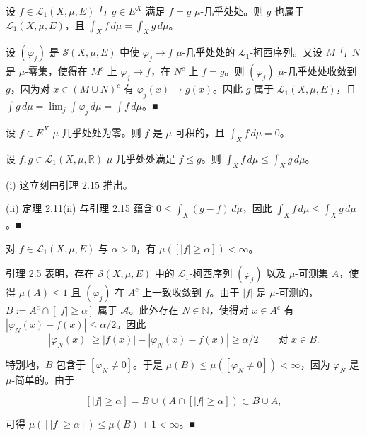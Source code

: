 \begin{lemma}

设 $ f \in \mathcal{L}_1(X,\mu,E) $ 与 $ g \in E^X $ 满足 $ f = g $ $ \mu $-几乎处处。则 $ g $ 也属于 $ \mathcal{L}_1(X,\mu,E) $，且 $ \int_X f \, d\mu = \int_X g \, d\mu $。

\proofhead
设 $ (\varphi_j) $ 是 $ \mathcal{S}(X,\mu,E) $ 中使 $ \varphi_j \to f $ $ \mu $-几乎处处的 $ \mathcal{L}_1 $-柯西序列。又设 $ M $ 与 $ N $ 是 $ \mu $-零集，使得在 $ M^c $ 上 $ \varphi_j \to f $，在 $ N^c $ 上 $ f = g $。则 $ (\varphi_j) $ $ \mu $-几乎处处收敛到 $ g $，因为对 $ x \in (M \cup N)^c $ 有 $ \varphi_j(x) \to g(x) $。因此 $ g $ 属于 $ \mathcal{L}_1(X,\mu,E) $，且 $ \int g \, d\mu = \lim_{j} \int \varphi_j \, d\mu = \int f \, d\mu $。\nobreak\hspace{0.35em}■
\end{lemma}

\begin{corollary}

\begin{subitems}
\item

设 $ f \in E^X $ $ \mu $-几乎处处为零。则 $ f $ 是 $ \mu $-可积的，且 $ \int_X f \, d\mu = 0 $。

\item

设 $ f, g \in \mathcal{L}_1(X,\mu,\mathbb{R}) $ $ \mu $-几乎处处满足 $ f \le g $。则 $ \int_X f \, d\mu \le \int_X g \, d\mu $。

\proofhead
(i) 这立刻由引理 2.15 推出。
\end{subitems}

(ii) 定理 2.11(ii) 与引理 2.15 蕴含 $ 0 \le \int_X (g - f) \, d\mu $，因此 $ \int_X f \, d\mu \le \int_X g \, d\mu $。\nobreak\hspace{0.35em}■

\end{corollary}

\begin{proposition}

对 $ f \in \mathcal{L}_1(X,\mu,E) $ 与 $ \alpha > 0 $，有 $ \mu([|f| \ge \alpha]) < \infty $。

\proofhead
引理 2.5 表明，存在 $ \mathcal{S}(X,\mu,E) $ 中的 $ \mathcal{L}_1 $-柯西序列 $ (\varphi_j) $ 以及 $ \mu $-可测集 $ A $，使得 $ \mu(A) \le 1 $ 且 $ (\varphi_j) $ 在 $ A^c $ 上一致收敛到 $ f $。由于 $ |f| $ 是 $ \mu $-可测的，$ B := A^c \cap [|f| \ge \alpha] $ 属于 $ \mathcal{A} $。此外存在 $ N \in \mathbb{N} $，使得对 $ x \in A^c $ 有 $ |\varphi_N(x) - f(x)| \le \alpha/2 $。因此
\[
|\varphi_N(x)| \ge |f(x)| - |\varphi_N(x) - f(x)| \ge \alpha/2 \qquad \text{对 } x \in B .
\]

特别地，$ B $ 包含于 $ [\varphi_N \ne 0] $。于是 $ \mu(B) \le \mu([\varphi_N \ne 0]) < \infty $，因为 $ \varphi_N $ 是 $ \mu $-简单的。由于

\[
[|f| \ge \alpha] = B \cup (A \cap [|f| \ge \alpha]) \subset B \cup A ,
\]

可得 $ \mu([|f| \ge \alpha]) \le \mu(B) + 1 < \infty $。\nobreak\hspace{0.35em}■

\end{proposition}

